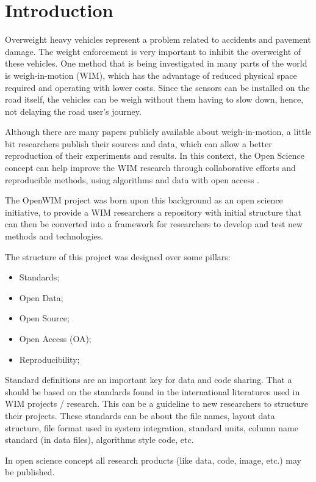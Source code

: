 \documentclass[a4paper]{article}
\begin{document}
\section{Introduction}
{

Overweight heavy vehicles represent a problem related to accidents and pavement damage. The weight enforcement is very important to inhibit the overweight of these vehicles. One method that is being investigated in many parts of the world is weigh-in-motion (WIM), which has the advantage of reduced physical space required and operating with lower costs. Since the sensors can be installed on the road itself, the vehicles can be weigh without them having to slow down, hence, not delaying the road user’s journey.

Although there are many papers publicly available about weigh-in-motion, a little bit researchers publish their sources and data, which can allow a better reproduction of their experiments and results. In this context, the Open Science concept can help improve the WIM research through collaborative efforts and reproducible methods, using algorithms and data with open access \cite{garvin2008yours}.

The OpenWIM project was born upon this background as an open science initiative, to provide a WIM researchers a repository with initial structure that can then be converted into a framework for researchers to develop and test new methods and technologies.

The structure of this project was designed over some pillars:
\begin{itemize}
\item Standards;
\item Open Data;
\item Open Source;
\item Open Access (OA);
\item Reproducibility;
\end{itemize}

Standard definitions are an important key for data and code sharing. That a should be based on the standards found in the international literatures used in WIM projects / research. This can be a guideline to new researchers to structure their projects. These standards can be about the file names, layout data structure, file format used in system integration, standard units, column name standard (in data files), algorithms style code, etc.

In open science concept all research products (like data, code, image, etc.) may be published.

}
\end{document}
